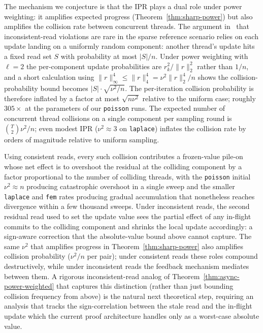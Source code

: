 \documentclass[pdflatex,sn-mathphys-num]{sn-jnl}%
\theoremstyle{thmstyleone}%
\theoremstyle{thmstyletwo}%
\theoremstyle{thmstylethree}%
\begin{document}
The mechanism we conjecture is that the IPR plays a dual role under
power weighting: it amplifies expected progress
(Theorem~\ref{thm:sharp-power}) but also amplifies the collision rate
between concurrent threads. The argument in~\cite{avron2015revisiting}
that inconsistent-read violations are rare in the sparse reference
scenario relies on each update landing on a uniformly random component:
another thread's update hits a fixed read set $S$ with probability at
most $|S|/n$. Under power weighting with $\ell = 2$ the per-component
update probabilities are $r_k^2 / \|r\|_2^2$ rather than $1/n$, and a
short calculation using $\|r\|_\infty^4 \leq \|r\|_4^4 = \nu^2 \|r\|_2^4 / n$
shows the collision-probability bound becomes
$|S| \cdot \sqrt{\nu^2/n}$. The per-iteration collision probability is
therefore inflated by a factor at most $\sqrt{n\nu^2}$ relative to the
uniform case; roughly $305\times$ at the parameters of our \texttt{poisson}
runs. The expected number of concurrent thread collisions on a single
component per sampling round is $\binom{T}{2}\nu^2/n$; even modest IPR
($\nu^2 \approx 3$ on \texttt{laplace}) inflates the collision rate by
orders of magnitude relative to uniform sampling. 

Using consistent
reads, every such collision contributes a frozen-value pile-on whose net
effect is to overshoot the residual at the colliding component by a
factor proportional to the number of colliding threads, with the
\texttt{poisson} initial $\nu^2 \approx n$ producing catastrophic
overshoot in a single sweep and the smaller \texttt{laplace} and
\texttt{fem} rates producing gradual accumulation that nonetheless
reaches divergence within a few thousand sweeps. Under inconsistent
reads, the second residual read used to set the update value sees the
partial effect of any in-flight commits to the colliding component and
shrinks the local update accordingly: a sign-aware correction that the
absolute-value bound above cannot capture. The same $\nu^2$ that
amplifies progress in Theorem~\ref{thm:sharp-power} also amplifies
collision probability ($\nu^2/n$ per pair); under consistent reads
these roles compound destructively, while under inconsistent reads the
feedback mechanism mediates between them. A rigorous inconsistent-read
analog of Theorem~\ref{thm:async-power-weighted} that captures this
distinction (rather than just bounding collision frequency from above)
is the natural next theoretical step, requiring an analysis that tracks
the sign-correlation between the stale read and the in-flight update
which the current proof architecture handles only as a worst-case
absolute value.
\end{document}
